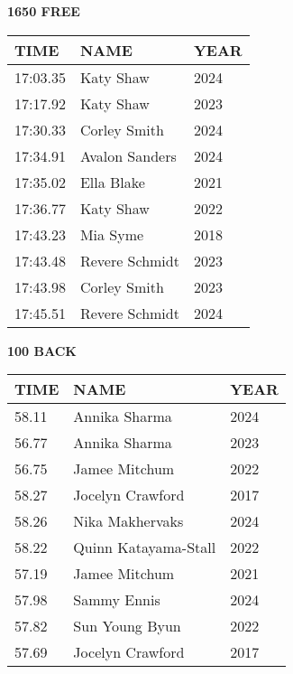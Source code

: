\begin{table}[H]
\centering
\begin{minipage}[t]{0.48\textwidth}
\centering
\textbf{1650 FREE}\\[0.1cm]
\begin{tabular}{@{}p{1.8cm}p{2.8cm}p{1.2cm}@{}}
\hline
    \textbf{TIME} & \textbf{NAME} & \textbf{YEAR} \\
\hline
    17:03.35 & Katy Shaw & 2024 \\
    17:17.92 & Katy Shaw & 2023 \\
    17:30.33 & Corley Smith & 2024 \\
    17:34.91 & Avalon Sanders & 2024 \\
    17:35.02 & Ella Blake & 2021 \\
    17:36.77 & Katy Shaw & 2022 \\
    17:43.23 & Mia Syme & 2018 \\
    17:43.48 & Revere Schmidt & 2023 \\
    17:43.98 & Corley Smith & 2023 \\
    17:45.51 & Revere Schmidt & 2024 \\
\hline
\end{tabular}
\end{minipage}\hfill
\begin{minipage}[t]{0.48\textwidth}
\centering
\textbf{100 BACK}\\[0.1cm]
\begin{tabular}{@{}p{1.8cm}p{2.8cm}p{1.2cm}@{}}
\hline
    \textbf{TIME} & \textbf{NAME} & \textbf{YEAR} \\
\hline
    58.11 & Annika Sharma & 2024 \\
    56.77 & Annika Sharma & 2023 \\
    56.75 & Jamee Mitchum & 2022 \\
    58.27 & Jocelyn Crawford & 2017 \\
    58.26 & Nika Makhervaks & 2024 \\
    58.22 & Quinn Katayama-Stall & 2022 \\
    57.19 & Jamee Mitchum & 2021 \\
    57.98 & Sammy Ennis & 2024 \\
    57.82 & Sun Young Byun & 2022 \\
    57.69 & Jocelyn Crawford & 2017 \\
\hline
\end{tabular}
\end{minipage}
\end{table}

